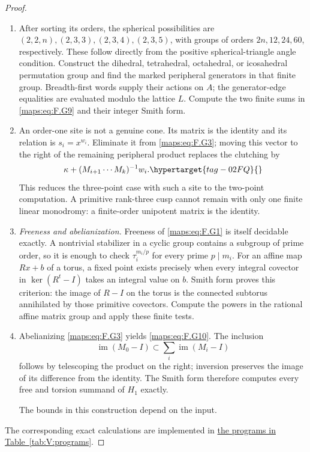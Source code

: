 \documentclass[11pt,a4paper]{article}
\numberwithin{equation}{section}
\theoremstyle{definition}
\begin{document}
\begin{proof}
\begin{enumerate}[label=\arabic*.]
\item After sorting its orders, the spherical possibilities are
$(2,2,n),(2,3,3),(2,3,4),(2,3,5)$, with groups of orders
$2n,12,24,60$, respectively.  These follow directly from
the positive spherical-triangle angle condition.
Construct the dihedral, tetrahedral, octahedral, or icosahedral
permutation group and find the marked peripheral generators in that
finite group. Breadth-first words supply their actions on $A$;
the generator-edge equalities are evaluated modulo the lattice $L$.
Compute the two finite sums in \eqref{maps:eq:F.G9} and their integer Smith form.

\item An order-one site is not a genuine cone.  Its matrix is the
identity and its relation is $s_i=x^{w_i}$.  Eliminate it
from \eqref{maps:eq:F.G3}; moving this vector to the right of the remaining
peripheral product replaces the clutching by
\begin{equation}
       \kappa+(M_{i+1}\cdots M_k)^{-1}w_i.                 \hypertarget{tag-02FQ}{}\label{maps:eq:F.G11}
\end{equation}
This reduces the three-point case with such a site to the
two-point computation.  A primitive rank-three cusp cannot
remain with only one finite linear monodromy: a finite-order
unipotent matrix is the identity.  

\item \emph{Freeness and abelianization.}
Freeness of \eqref{maps:eq:F.G1} is itself decidable exactly.  A nontrivial
stabilizer in a cyclic group contains a subgroup of prime
order, so it is enough to check $\tau_i^{m_i/p}$ for every
prime $p\mid m_i$.  For an affine map $Rx+b$ of a torus,
a fixed point exists precisely when every integral covector
in $\ker(R^t-I)$ takes an integral value on $b$.
Smith form proves this criterion: the image of $R-I$ on
the torus is the connected subtorus annihilated by those
primitive covectors. Compute the powers in the rational affine
matrix group and apply these finite tests.

\item Abelianizing \eqref{maps:eq:F.G3} yields \eqref{maps:eq:F.G10}.  The inclusion
\[
 \operatorname{im}(M_0-I)
       \subset\sum_i\operatorname{im}(M_i-I)
\]
follows by telescoping the product on the right; inversion
preserves the image of its difference from the identity.
The Smith form therefore computes every free and torsion
summand of $H_1$ exactly.

The bounds in this construction depend on the input.

\end{enumerate}
The corresponding exact calculations are implemented in \hyperlink{prog:V:fundamental-group}{the programs in Table~\ref*{tab:V:programs}}.
\end{proof}
\end{document}
